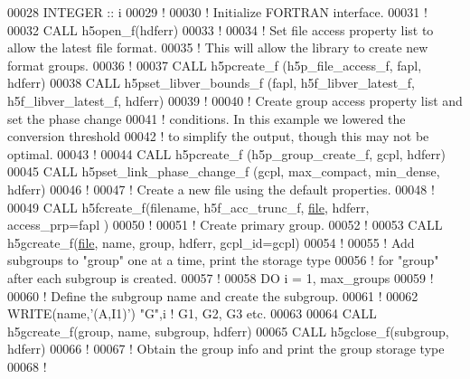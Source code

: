 \begin{DoxyCode}
00028   \textcolor{keywordtype}{INTEGER} :: i
00029   \textcolor{comment}{!}
00030   \textcolor{comment}{! Initialize FORTRAN interface.}
00031   \textcolor{comment}{!}
00032   \textcolor{keyword}{CALL }h5open\_f(hdferr)
00033   \textcolor{comment}{!}
00034   \textcolor{comment}{! Set file access property list to allow the latest file format.}
00035   \textcolor{comment}{! This will allow the library to create new format groups.}
00036   \textcolor{comment}{!}
00037   \textcolor{keyword}{CALL }h5pcreate\_f (h5p\_file\_access\_f, fapl, hdferr)
00038   \textcolor{keyword}{CALL }h5pset\_libver\_bounds\_f (fapl, h5f\_libver\_latest\_f, h5f\_libver\_latest\_f, hdferr)
00039   \textcolor{comment}{!}
00040   \textcolor{comment}{! Create group access property list and set the phase change}
00041   \textcolor{comment}{! conditions.  In this example we lowered the conversion threshold}
00042   \textcolor{comment}{! to simplify the output, though this may not be optimal.}
00043   \textcolor{comment}{!}
00044   \textcolor{keyword}{CALL }h5pcreate\_f (h5p\_group\_create\_f, gcpl, hdferr)
00045   \textcolor{keyword}{CALL }h5pset\_link\_phase\_change\_f (gcpl, max\_compact, min\_dense, hdferr)
00046   \textcolor{comment}{!}
00047   \textcolor{comment}{! Create a new file using the default properties.}
00048   \textcolor{comment}{!}
00049   \textcolor{keyword}{CALL }h5fcreate\_f(filename, h5f\_acc\_trunc\_f, \hyperlink{structfile}{file}, hdferr, access\_prp=fapl )
00050   \textcolor{comment}{!}
00051   \textcolor{comment}{! Create primary group.}
00052   \textcolor{comment}{!}
00053   \textcolor{keyword}{CALL }h5gcreate\_f(\hyperlink{structfile}{file}, name, group, hdferr, gcpl\_id=gcpl)
00054   \textcolor{comment}{!}
00055   \textcolor{comment}{! Add subgroups to "group" one at a time, print the storage type}
00056   \textcolor{comment}{! for "group" after each subgroup is created.}
00057   \textcolor{comment}{!}
00058   \textcolor{keywordflow}{DO} i = 1, max\_groups
00059      \textcolor{comment}{!}
00060      \textcolor{comment}{! Define the subgroup name and create the subgroup.}
00061      \textcolor{comment}{!}
00062      \textcolor{keyword}{WRITE}(name,\textcolor{stringliteral}{'(A,I1)'}) \textcolor{stringliteral}{"G"},i \textcolor{comment}{! G1, G2, G3 etc.}
00063 
00064      \textcolor{keyword}{CALL }h5gcreate\_f(group, name, subgroup, hdferr)
00065      \textcolor{keyword}{CALL }h5gclose\_f(subgroup, hdferr)
00066      \textcolor{comment}{!}
00067      \textcolor{comment}{! Obtain the group info and print the group storage type}
00068      \textcolor{comment}{!}

\end{DoxyCode}
